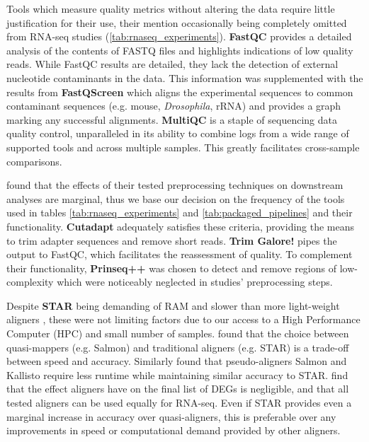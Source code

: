Tools which measure quality metrics without altering the data require little justification for their use, their mention occasionally being completely omitted from RNA-seq studies (\autoref{tab:rnaseq_experiments}). \textbf{FastQC} provides a detailed analysis of the contents of FASTQ files and highlights indications of low quality reads. While FastQC results are detailed, they lack the detection of external nucleotide contaminants in the data. This information was supplemented with the results from \textbf{FastQScreen} which aligns the experimental sequences to common contaminant sequences (e.g. mouse, \textit{Drosophila}, rRNA) and provides a graph marking any successful alignments. \textbf{MultiQC} is a staple of sequencing data quality control, unparalleled in its ability to combine logs from a wide range of supported tools and across multiple samples. This greatly facilitates cross-sample comparisons.

\cite{he2020assessing} found that the effects of their tested preprocessing techniques on downstream analyses are marginal, thus we base our decision on the frequency of the tools used in tables \ref{tab:rnaseq_experiments} and \ref{tab:packaged_pipelines} and their functionality. \textbf{Cutadapt} adequately satisfies these criteria, providing the means to trim adapter sequences and remove short reads. \textbf{Trim Galore!} pipes the output to FastQC, which facilitates the reassessment of quality. To complement their functionality, \textbf{Prinseq++} was chosen to detect and remove regions of low-complexity which were noticeably neglected in studies' preprocessing steps. 

Despite \textbf{STAR} being demanding of RAM \citep{Dobin2013} and slower than more light-weight aligners \citep{srivastava2020alignment}, these were not limiting factors due to our access to a High Performance Computer (HPC) and small number of samples. \cite{srivastava2020alignment} found that the choice between quasi-mappers (e.g. Salmon) and traditional aligners (e.g. STAR) is a trade-off between speed and accuracy. Similarly \cite{Zhang2017} found that pseudo-aligners Salmon and Kallisto require less runtime while maintaining similar accuracy to STAR. \cite{Schaarschmidt2020} find that the effect aligners have on the final list of \ac{DEG}s is negligible, and that all tested aligners can be used equally for RNA-seq. Even if STAR provides even a marginal increase in accuracy over quasi-aligners, this is preferable over any improvements in speed or computational demand provided by other aligners.

